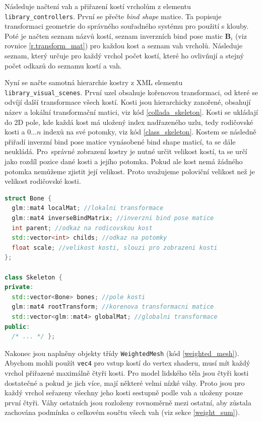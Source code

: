 Následuje načtení vah a přiřazení kostí vrcholům z elementu  \texttt{library\_controllers}. První se přečte \textit{bind shape} matice. Ta popisuje transformaci geometrie do správného souřadného systému pro použití s klouby. Poté je načten seznam názvů kostí, seznam inverzních bind pose matic $\mathbf{B}_i$ (viz rovnice \ref{r.transform_mat}) pro každou kost a seznam vah vrcholů. Následuje seznam, který určuje pro každý vrchol počet kostí, které ho ovlivňují a stejný počet odkazů do seznamu kostí a vah.

Nyní se načte samotná hierarchie kostry z XML elementu \texttt{library\_visual\_scenes}. První uzel obsahuje kořenovou transformaci, od které se odvíjí další transformace všech kostí. Kosti jsou hierarchicky zanořené, obsahují název a lokální transformační matici, viz kód \ref{collada_skeleton}. Kosti se ukládají do 2D pole, kde každá kost má uložený index nadřazeného uzlu, tedy rodičovské kosti a $0 \dots n$ indexů na své potomky, viz kód \ref{class_skeleton}. Kostem se následně přiřadí inverzní bind pose matice vynásobené bind shape maticí, ta se dále neukládá. Pro~správné zobrazení kostry je nutné určit velikost kostí, ta se určí jako rozdíl pozice dané kosti a jejího potomka. Pokud ale kost nemá žádného potomka nemůžeme zjistit její velikost. Proto uvažujeme poloviční velikost než je velikost rodičovské kosti.

\begin{lstlisting}[float,floatplacement=H,language=C++, caption={Třída kostry.}, label={class_skeleton}
]
struct Bone {
  glm::mat4 localMat; //lokalni transformace
  glm::mat4 inverseBindMatrix; //inverzni bind pose matice
  int parent; //odkaz na rodicovskou kost
  std::vector<int> childs; //odkaz na potomky
  float scale; //velikost kosti, slouzi pro zobrazeni kosti 
};

class Skeleton {
private:
  std::vector<Bone> bones; //pole kosti
  glm::mat4 rootTransform; //korenova transformacni matice
  std::vector<glm::mat4> globalMat; //globalni transformace
public:
  /* ... */ };
\end{lstlisting}

Nakonec jsou naplněny objekty třídy \texttt{WeightedMesh} (kód \ref{weighted_mesh}). Abychom mohli použít \texttt{vec4} pro vstup kostí do vertex shaderu, musí mít každý vrchol přiřazené maximálně čtyři kosti. Pro model lidského těla jsou čtyři kosti dostatečné a pokud je jich více, mají některé velmi nízké váhy. Proto jsou pro každý vrchol seřazeny všechny jeho kosti sestupně podle vah a uloženy pouze první čtyři. Váhy ostatních jsou rozloženy rovnoměrně mezi ostatní, aby zůstala zachována podmínka o celkovém součtu všech vah (viz sekce \ref{weight_sum}).

